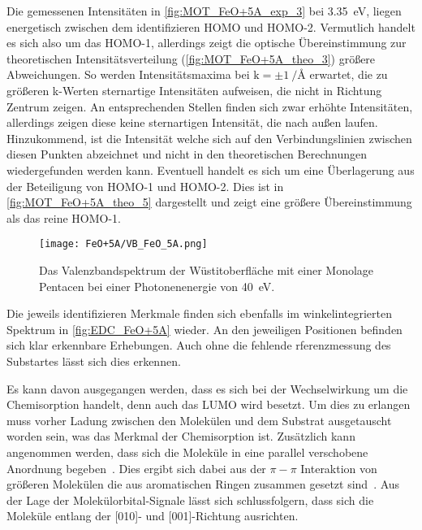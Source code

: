        Die gemessenen Intensitäten in \autoref{fig:MOT_FeO+5A_exp_3} bei \SI{3.35}{\electronvolt}, liegen energetisch zwischen dem identifizieren HOMO und HOMO-2.
        Vermutlich handelt es sich also um das HOMO-1, allerdings zeigt die optische Übereinstimmung zur theoretischen Intensitätsverteilung (\autoref{fig:MOT_FeO+5A_theo_3}) größere Abweichungen.
        So werden Intensitätsmaxima bei $\text{k} = \pm\SI[per-mode=reciprocal]{1}{\per\angstrom}$ erwartet, die zu größeren k-Werten sternartige Intensitäten aufweisen, die nicht in Richtung Zentrum zeigen.
        An entsprechenden Stellen finden sich zwar erhöhte Intensitäten, allerdings zeigen diese keine sternartigen Intensität, die nach außen laufen.
        Hinzukommend, ist die Intensität welche sich auf den Verbindungslinien zwischen diesen Punkten abzeichnet und nicht in den theoretischen Berechnungen wiedergefunden werden kann.
        Eventuell handelt es sich um eine Überlagerung aus der Beteiligung von HOMO-1 und HOMO-2.
        Dies ist in \autoref{fig:MOT_FeO+5A_theo_5} dargestellt und zeigt eine größere Übereinstimmung als das reine HOMO-1.

        \begin{figure}
            \centering
            \texttt{[image: FeO+5A/VB\_FeO\_5A.png]}
            \caption{Das Valenzbandspektrum der Wüstitoberfläche mit einer Monolage Pentacen bei einer Photonenenergie von \SI{40}{\electronvolt}.}
            \label{fig:EDC_FeO+5A}
        \end{figure}
        Die jeweils identifizieren Merkmale finden sich ebenfalls im winkelintegrierten Spektrum in \autoref{fig:EDC_FeO+5A} wieder.
        An den jeweiligen Positionen befinden sich klar erkennbare Erhebungen.
        Auch ohne die fehlende rferenzmessung des Substartes lässt sich dies erkennen.

        Es kann davon ausgegangen werden, dass es sich bei der Wechselwirkung um die Chemisorption handelt, denn auch das LUMO wird besetzt.
        Um dies zu erlangen muss vorher Ladung zwischen den Molekülen und dem Substrat ausgetauscht worden sein, was das Merkmal der Chemisorption ist.
        Zusätzlich kann angenommen werden, dass sich die Moleküle in eine parallel verschobene Anordnung begeben~\cite{IF_13}.
        Dies ergibt sich dabei aus der $\pi-\pi$ Interaktion von größeren Molekülen die aus aromatischen Ringen zusammen gesetzt sind~\cite{IF_13}.
        Aus der Lage der Molekülorbital-Signale lässt sich schlussfolgern, dass sich die Moleküle entlang der [010]- und [001]-Richtung ausrichten.

